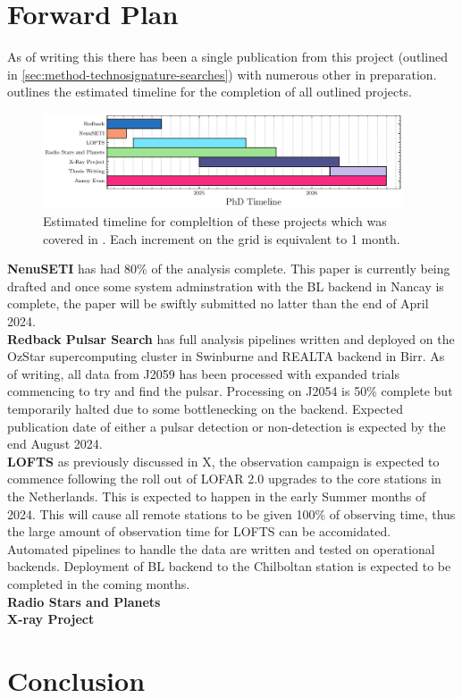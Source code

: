 \section{Forward Plan}

As of writing this there has been a single publication from this project (outlined in \cref{sec:method-technosignature-searches}) with numerous other in preparation.  outlines the estimated timeline for the completion of all outlined projects.

\begin{figure}[h]
    \centering
    \includegraphics[width=0.95\textwidth]{figs/PhD_gannt_chart.pdf}
    \caption{Estimated timeline for compleltion of these projects which was covered in . Each increment on the grid is equivalent to 1 month.}
    \label{fig:gannt_chart}
\end{figure}

\textbf{NenuSETI} has had 80\% of the analysis complete. This paper is currently being drafted and once some system adminstration with the BL backend in Nancay is complete, the paper will be swiftly submitted no latter than the end of April 2024. \\ 

\textbf{Redback Pulsar Search} has full analysis pipelines written and deployed on the OzStar supercomputing cluster in Swinburne and REALTA backend in Birr. As of writing, all data from J2059 has been processed with expanded trials commencing to try and find the pulsar. Processing on J2054 is 50\% complete but temporarily halted due to some bottlenecking on the backend. Expected publication date of either a pulsar detection or non-detection is expected by the end August 2024. \\

\textbf{LOFTS} as previously discussed in X, the observation campaign is expected to commence following the roll out of LOFAR 2.0 upgrades to the core stations in the Netherlands. This is expected to happen in the early Summer months of 2024. This will cause all remote stations to be given 100\% of observing time, thus the large amount of observation time for LOFTS can be accomidated. \\ Automated pipelines to handle the data are written and tested on operational backends. Deployment of BL backend to the Chilboltan station is expected to be completed in the coming months. \\ 

\textbf{Radio Stars and Planets} \\ 

\textbf{X-ray Project}

\section{Conclusion}